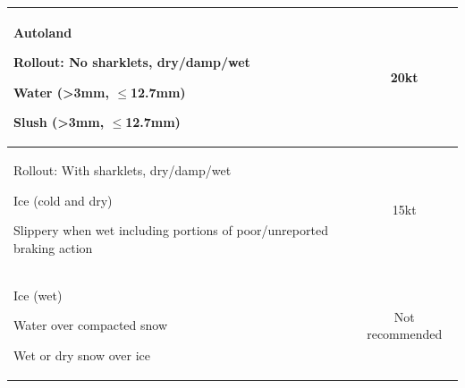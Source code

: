 \documentclass[twoside]{article}
\begin{document}
{\begin{center}
\begin{tabular}{|l|c|}
{\begin{compactitem}
     \item Autoland
     \item Rollout: No sharklets, dry/damp/wet
     \item Water (>3mm, $\leq$12.7mm)
     \item Slush (>3mm, $\leq$12.7mm)
    \end{compactitem}
    \vspace{1mm}} & 20kt\\\hline
  \parbox{0.5\textwidth}{
    \vspace{1mm}
    \begin{compactitem}
     \item Rollout:  With sharklets, dry/damp/wet
     \item Ice (cold and dry)
     \item Slippery when wet including portions of poor/unreported
       braking action
    \end{compactitem}
    \vspace{1mm}} & 15kt\\\hline
  \parbox{0.5\textwidth}{
    \vspace{1mm}
    \begin{compactitem}
     \item Ice (wet)
     \item Water over compacted snow
     \item Wet or dry snow over ice
    \end{compactitem}
    \vspace{1mm}} & Not recommended\\\hline
\end{tabular}
\end{center}}
\end{document}
